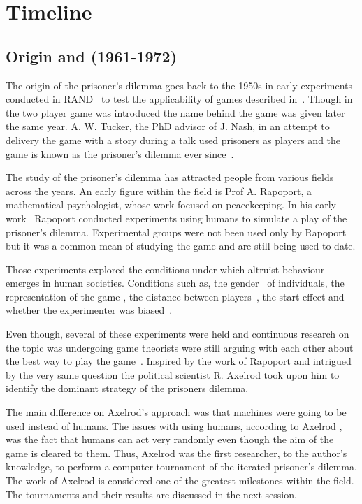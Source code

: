 \documentclass{article}
\begin{document}
\section{Timeline}\label{section:timeline}

\subsection{Origin and (1961-1972)}

The origin of the prisoner's dilemma goes back to the 1950s in early experiments
conducted in RAND~\cite{Flood1958} to test the applicability of games
described in~\cite{VonNeumann1944}. Though in~\cite{Flood1958} the two player game was
introduced the name behind the game was given later the same year.
A. W. Tucker, the PhD advisor of J. Nash, in an attempt to delivery the game
with a story during a talk used prisoners as players and the game is known as
the prisoner's dilemma ever since~\cite{Tucker1983}.

The study of the prisoner's dilemma has attracted people from various fields
across the years. An early figure within the field is Prof A. Rapoport,
a mathematical psychologist, whose work focused on peacekeeping.
In his early work~\cite{rapoport1965} Rapoport conducted experiments using humans
to simulate a play of the prisoner's dilemma. Experimental groups were not been
used only by Rapoport but it was a common mean of studying the game
\cite{Evans1966, Gallo1968, Lutzker1961, Mack1971, Sensenig1972} and are still
being used to date. %

Those experiments explored the conditions under which altruist behaviour emerges
in human societies. Conditions such as, the gender~\cite{Evans1966,
Lutzker1961, Mack1971} of individuals, the representation of the game
\cite{Evans1966}, the distance between players~\cite{Sensenig1972}, the start effect
\cite{Tedeschi1968} and whether the experimenter was biased~\cite{Gallo1968}.

Even though, several of these experiments were held and continuous research on
the topic was undergoing game theorists were still arguing with each other about
the best way to play the game~\cite{rapoport1965}. Inspired by the work of
Rapoport and intrigued by the very same question the political scientist R. 
Axelrod took upon him to identify the dominant strategy of the prisoners dilemma.
 
The main difference on Axelrod's approach was that machines were going to be used 
instead of humans. The issues with using humans, according to Axelrod
\cite{Axelrod2012}, was the fact that humans can act very randomly even though
the aim of the game is cleared to them. Thus, Axelrod was the first researcher,
to the author's knowledge, to perform a computer tournament of the iterated
prisoner's dilemma. The work of Axelrod is considered one of the greatest
milestones within the field. The tournaments and their results are discussed in
the next session.
\end{document}
